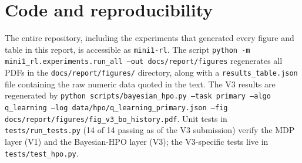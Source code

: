 \documentclass[11pt]{article}
\begin{document}
\section*{Code and reproducibility}

The entire repository, including the experiments that generated every
figure and table in this report, is accessible as \texttt{mini1-rl}.
The script \texttt{python -m mini1\_rl.experiments.run\_all --out
  docs/report/figures} regenerates all PDFs in the
\texttt{docs/report/figures/} directory, along with a
\texttt{results\_table.json} file containing the raw numeric data
quoted in the text. The V3 results are regenerated by
\texttt{python scripts/bayesian\_hpo.py --task primary --algo
  q\_learning --log data/hpo/q\_learning\_primary.json --fig
  docs/report/figures/fig\_v3\_bo\_history.pdf}. Unit tests in
\texttt{tests/run\_tests.py} (14 of 14 passing as of the V3
submission) verify the MDP layer (V1) and the Bayesian-HPO layer (V3);
the V3-specific tests live in \texttt{tests/test\_hpo.py}.



\end{document}
